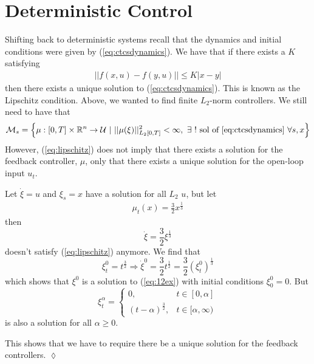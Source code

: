 \section{Deterministic Control}
Shifting back to deterministic systems recall that the dynamics and initial conditions were given by (\ref{eq:ctcsdynamics}). We have that if there exists a $K$ satisfying
\begin{align}
\label{eq:lipschitz}
||f(x,u)-f(y,u)||\leq K|x-y|
\end{align}
then there exists a unique solution to (\ref{eq:ctcsdynamics}). This is known as the Lipschitz condition. Above, we wanted to find finite $L_2$-norm controllers. We still need to have that
\begin{align}
\label{eq:controlspace}
\mathcal{M}_s = \left\lbrace \mu:[0,T]\times\mathbb{R}^n\to\mathcal{U} ~|~ ||\mu(\xi)||^2_{L_2[0,T]}<\infty, ~\exists~ ! \text{ sol of \ref{eq:ctcsdynamics} } \forall s,x \right\rbrace
\end{align}
However, (\ref{eq:lipschitz}) does not imply that there exists a solution for the feedback controller, $\mu$, only that there exists a unique solution for the open-loop input $u_t$.

\begin{example}
Let $\dot{\xi}=u$ and $\xi_s=x$ have a solution for all $L_2$ $u$, but let
\begin{align}
\label{eq:12ex}
\mu_t(x)=\frac{3}{2}x^{\frac{1}{3}}
\end{align}
then
$$\dot{\xi}=\frac{3}{2}\xi^{\frac{1}{3}}$$
doesn't satisfy (\ref{eq:lipschitz}) anymore. We find that
$$\xi_t^0=t^{\frac{3}{2}} \Rightarrow \dot{\xi}^0=\frac{3}{2}t^{\frac{1}{2}} = \frac{3}{2}(\xi_t^0)^{\frac{1}{3}}$$
which shows that $\xi^0$ is a solution to (\ref{eq:12ex}) with initial conditions $\xi_0^0=0$. But
$$\xi_t^\alpha = \begin{cases} 0, & t\in[0,\alpha] \\ (t-\alpha)^{\frac{3}{2}}, & t\in[\alpha,\infty) \end{cases}$$
is also a solution for all $\alpha\geq0$.

This shows that we have to require there be a unique solution for the feedback controllers.
$\lozenge$
\end{example}

